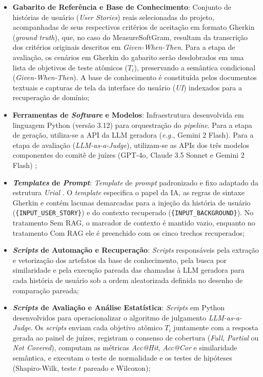 \begin{itemize}
    \item \textbf{Gabarito de Referência e Base de Conhecimento}: Conjunto de histórias de usuário (\textit{User Stories}) reais selecionadas do projeto, acompanhadas de seus respectivos critérios de aceitação em formato Gherkin (\textit{ground truth}), que, no caso do MeasureSoftGram, resultam da transcrição dos critérios originais descritos em \textit{Given-When-Then}. Para a etapa de avaliação, os cenários em Gherkin do gabarito serão desdobrados em uma lista de objetivos de teste atômicos ($T_i$), preservando a semântica condicional (\textit{Given-When-Then}). A base de conhecimento é constituída pelos documentos textuais e capturas de tela da interface do usuário (\textit{UI}) indexados para a recuperação de domínio;

    \item \textbf{Ferramentas de \textit{Software} e Modelos}: Infraestrutura desenvolvida em linguagem Python (versão 3.12) para orquestração do \textit{pipeline}. Para a etapa de geração, utiliza-se a API da LLM geradora (\textit{e.g.}, Gemini 2 Flash). Para a etapa de avaliação (\textit{LLM-as-a-Judge}), utilizam-se as APIs dos três modelos componentes do comitê de juízes (GPT-4o, Claude 3.5 Sonnet e Gemini 2 Flash) \cite{wang2025};

    \item \textbf{\textit{Templates} de \textit{Prompt}}: \textit{Template} de \textit{prompt} padronizado e fixo adaptado da estrutura \textit{Urial} \cite{wang2025}. O \textit{template} especifica o papel da IA, as regras de sintaxe Gherkin e contém lacunas demarcadas para a injeção da história de usuário (\texttt{\{INPUT\_USER\_STORY\}}) e do contexto recuperado (\texttt{\{INPUT\_BACKGROUND\}}). No tratamento Sem RAG, o marcador de contexto é mantido vazio, enquanto no tratamento Com RAG ele é preenchido com os cinco trechos recuperados;

    \item \textbf{\textit{Scripts} de Automação e Recuperação}: \textit{Scripts} responsáveis pela extração e vetorização dos artefatos da base de conhecimento, pela busca por similaridade e pela execução pareada das chamadas à LLM geradora para cada história de usuário sob a ordem aleatorizada definida no desenho de comparação pareada;

    \item \textbf{\textit{Scripts} de Avaliação e Análise Estatística}: \textit{Scripts} em Python desenvolvidos para operacionalizar o algoritmo de julgamento \textit{LLM-as-a-Judge}. Os \textit{scripts} enviam cada objetivo atômico $T_i$ juntamente com a resposta gerada ao painel de juízes, registram o consenso de cobertura (\textit{Full}, \textit{Partial} ou \textit{Not Covered}), computam as métricas \textit{Acc@Hit}, \textit{Acc@Cor} e similaridade semântica, e executam o teste de normalidade e os testes de hipóteses (Shapiro-Wilk, teste $t$ pareado e Wilcoxon);


\end{itemize}
